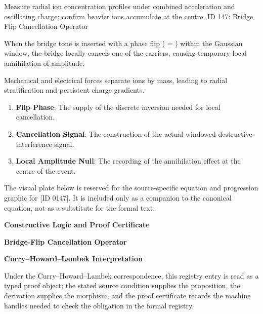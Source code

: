Measure radial ion concentration profiles under combined acceleration and oscillating charge; confirm heavier ions accumulate at the centre. ID 147: Bridge Flip Cancellation Operator

When the bridge tone is inserted with a phase flip (   =  ) within the Gaussian window, the bridge locally cancels one of the carriers, causing temporary local annihilation of amplitude.

Mechanical and electrical forces separate ions by mass, leading to radial stratification and persistent charge gradients.
\endgroup

\begin{enumerate}[leftmargin=1.6em,itemsep=6pt,topsep=4pt]
\item \textbf{Flip Phase}: The supply of the discrete inversion needed for local cancellation.
\item \textbf{Cancellation Signal}: The construction of the actual windowed destructive-interference signal.
\item \textbf{Local Amplitude Null}: The recording of the annihilation effect at the centre of the event.
\end{enumerate}

\begingroup\footnotesize\sloppy
The visual plate below is reserved for the source-specific equation and progression graphic for [ID 0147]. It is included only as a companion to the canonical equation, not as a substitute for the formal text.
\par\endgroup
\ifTZPDarkEdition
{}
\fi

\clearpage
\begingroup\tzpsupportsetup
\noindent\textbf{\fontsize{10.8pt}{12.8pt}\selectfont [ID 0147] Constructive Logic and Proof Certificate}\par
\noindent\textbf{\fontsize{10pt}{12pt}\selectfont Bridge-Flip Cancellation Operator}\par
\vspace{0.45em}
\begingroup
\footnotesize
\setlength{\parskip}{0.22em}
\setlength{\parindent}{0pt}
\noindent\textbf{Curry--Howard--Lambek Interpretation}\par
Under the Curry--Howard--Lambek correspondence, this registry entry is read as a typed proof
object: the stated source condition supplies the proposition, the derivation supplies the
morphism, and the proof certificate records the machine handles needed to check the obligation
in the formal registry.

